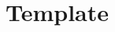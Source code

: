 \documentclass[aspectratio=169,utf8]{ctexbeamer}
\begin{document}
%
%
%
%
%
%

\section{Template}
\end{document}
